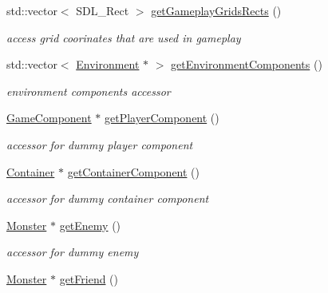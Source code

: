 \begin{DoxyCompactItemize}
std\+::vector$<$ S\+D\+L\+\_\+\+Rect $>$ \hyperlink{class_level_a040994ac065280b1d52524bbcba2bbaa}{get\+Gameplay\+Grids\+Rects} ()
\begin{DoxyCompactList}\small\item\em access grid coorinates that are used in gameplay \end{DoxyCompactList}\item 
\hypertarget{class_level_ae3f60439fa36c03b1dfcf1d3e6594b23}{}\label{class_level_ae3f60439fa36c03b1dfcf1d3e6594b23} 
std\+::vector$<$ \hyperlink{class_environment}{Environment} $\ast$ $>$ \hyperlink{class_level_ae3f60439fa36c03b1dfcf1d3e6594b23}{get\+Environment\+Components} ()
\begin{DoxyCompactList}\small\item\em environment components accessor \end{DoxyCompactList}\item 
\hypertarget{class_level_a190ab96a4270516c4f89e356231ef243}{}\label{class_level_a190ab96a4270516c4f89e356231ef243} 
\hyperlink{class_game_component}{Game\+Component} $\ast$ \hyperlink{class_level_a190ab96a4270516c4f89e356231ef243}{get\+Player\+Component} ()
\begin{DoxyCompactList}\small\item\em accessor for dummy player component \end{DoxyCompactList}\item 
\hypertarget{class_level_a8ff05204c68c313eb656cd2897842721}{}\label{class_level_a8ff05204c68c313eb656cd2897842721} 
\hyperlink{class_container}{Container} $\ast$ \hyperlink{class_level_a8ff05204c68c313eb656cd2897842721}{get\+Container\+Component} ()
\begin{DoxyCompactList}\small\item\em accessor for dummy container component \end{DoxyCompactList}\item 
\hypertarget{class_level_a0c2bba08da53fd7894c80c4e6ecd402c}{}\label{class_level_a0c2bba08da53fd7894c80c4e6ecd402c} 
\hyperlink{class_monster}{Monster} $\ast$ \hyperlink{class_level_a0c2bba08da53fd7894c80c4e6ecd402c}{get\+Enemy} ()
\begin{DoxyCompactList}\small\item\em accessor for dummy enemy \end{DoxyCompactList}\item 
\hypertarget{class_level_abe392ee79c0a831ab86dfccb5c02f069}{}\label{class_level_abe392ee79c0a831ab86dfccb5c02f069} 
\hyperlink{class_monster}{Monster} $\ast$ \hyperlink{class_level_abe392ee79c0a831ab86dfccb5c02f069}{get\+Friend} ()

\end{DoxyCompactItemize}
